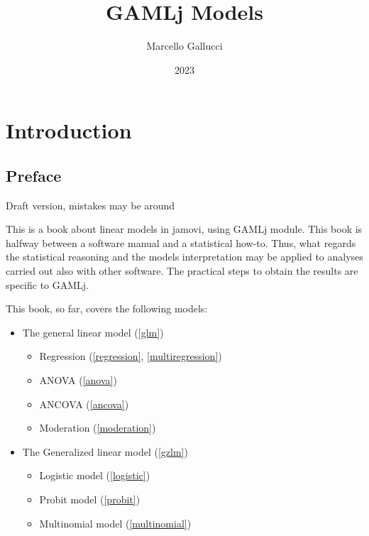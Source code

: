 \documentclass[
]{book}
\title{GAMLj Models}
\author{Marcello Gallucci}
\date{2023}
\providecommand{\tightlist}{%
  \setlength{\itemsep}{0pt}\setlength{\parskip}{0pt}}
\begin{document}
\maketitle

{
\setcounter{tocdepth}{1}
\tableofcontents
}
\hypertarget{booklet}{%
\chapter{Introduction}\label{booklet}}

\hypertarget{preface}{%
\section{Preface}\label{preface}}

{ Draft version, mistakes may be around }

This is a book about linear models in {jamovi}, using {GAMLj} module. This book is halfway between a software manual and a statistical how-to. Thus, what regards the statistical reasoning and the models interpretation may be applied to analyses carried out also with other software. The practical steps to obtain the results are specific to {GAMLj}.

This book, so far, covers the following models:

\begin{itemize}
\tightlist
\item
  The general linear model (\ref{glm})

  \begin{itemize}
  \tightlist
  \item
    Regression (\ref{regression}, \ref{multiregression})
  \item
    ANOVA (\ref{anova})
  \item
    ANCOVA (\ref{ancova})
  \item
    Moderation (\ref{moderation})
  \end{itemize}
\item
  The Generalized linear model (\ref{gzlm})

  \begin{itemize}
  \tightlist
  \item
    Logistic model (\ref{logistic})
  \item
    Probit model (\ref{probit})
  \item
    Multinomial model (\ref{multinomial})
  \end{itemize}
\end{itemize}
\end{document}

